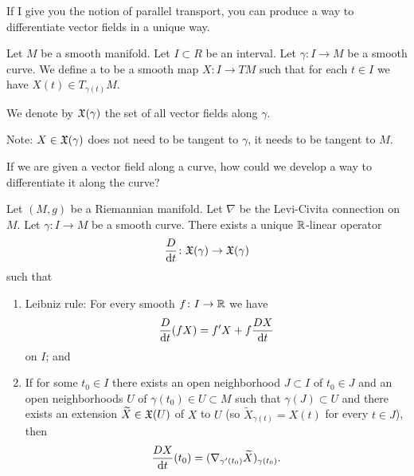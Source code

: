 \begin{node}
If I give you the notion of parallel transport, you can produce a way
to differentiate vector fields in a unique way.
\end{node}

\begin{definition}
Let $M$ be a smooth manifold. Let $I\subset R$ be an interval. Let
$\gamma\colon I\to M$ be a smooth curve. We define a  to be a smooth map $X\colon I\to TM$
such that for each $t\in I$ we have $X(t)\in T_{\gamma(t)}M$.

We denote by $\mathfrak{X}(\gamma)$ the set of all vector fields along $\gamma$.

Note: $X\in\mathfrak{X}(\gamma)$ does not need to be tangent to $\gamma$, it
needs to be tangent to $M$.
\end{definition}

\begin{node}
If we are given a vector field along a curve, how could we develop a
way to differentiate it along the curve?
\end{node}

\begin{theorem}
Let $(M,g)$ be a Riemannian manifold. Let $\nabla$ be the Levi-Civita
connection on $M$. Let $\gamma\colon I\to M$ be a smooth curve. There
exists a unique $\mathbb{R}$-linear operator
\begin{equation}
\frac{D}{\mathrm{d} t}\colon\mathfrak{X}(\gamma)\to\mathfrak{X}(\gamma)
\end{equation}
such that
\begin{enumerate}
\item Leibniz rule: For every smooth $f\colon I\to\mathbb{R}$ we have
  \begin{equation}
\frac{D}{\mathrm{d} t}(f X)=f'X+f\frac{DX}{\mathrm{d} t}
  \end{equation}
  on $I$; and
\item If for some $t_{0}\in I$ there exists an open neighborhood
  $J\subset I$ of $t_{0}\in J$ and an open neighborhoods $U$ of
  $\gamma(t_{0})\in U\subset M$ such that $\gamma(J)\subset U$ and
  there exists an extension $\widetilde{X}\in\mathfrak{X}(U)$ of $X$ to $U$
  (so $\widetilde{X}_{\gamma(t)}=X(t)$ for every $t\in J$),
  then
  \begin{equation}
\frac{DX}{\mathrm{d} t}(t_{0})=(\nabla_{\gamma'(t_{0})}\widetilde{X})_{\gamma(t_{0})}.
  \end{equation}
\end{enumerate}
\end{theorem}

